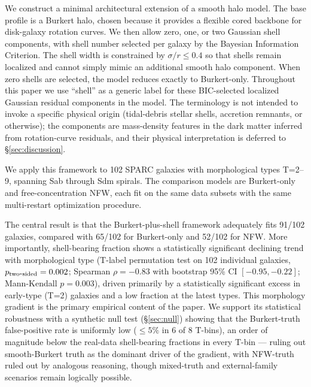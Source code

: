 We construct a minimal architectural extension of a smooth halo model. The base profile is a Burkert halo, chosen because it provides a flexible cored backbone for disk-galaxy rotation curves. We then allow zero, one, or two Gaussian shell components, with shell number selected per galaxy by the Bayesian Information Criterion. The shell width is constrained by $\sigma/r \leq 0.4$ so that shells remain localized and cannot simply mimic an additional smooth halo component. When zero shells are selected, the model reduces exactly to Burkert-only. Throughout this paper we use ``shell'' as a generic label for these BIC-selected localized Gaussian residual components in the model. The terminology is not intended to invoke a specific physical origin (tidal-debris stellar shells, accretion remnants, or otherwise); the components are mass-density features in the dark matter inferred from rotation-curve residuals, and their physical interpretation is deferred to \S\ref{sec:discussion}.

We apply this framework to 102 SPARC \citep{Lelli2016} galaxies with morphological types T=2--9, spanning Sab through Sdm spirals. The comparison models are Burkert-only and free-concentration NFW, each fit on the same data subsets with the same multi-restart optimization procedure.

The central result is that the Burkert-plus-shell framework adequately fits 91/102 galaxies, compared with 65/102 for Burkert-only and 52/102 for NFW. More importantly, shell-bearing fraction shows a statistically significant declining trend with morphological type (T-label permutation test on 102 individual galaxies, $p_{\rm two\mbox{-}sided} = 0.002$; Spearman $\rho = -0.83$ with bootstrap 95\% CI $[-0.95, -0.22]$; Mann-Kendall $p = 0.003$), driven primarily by a statistically significant excess in early-type (T=2) galaxies and a low fraction at the latest types. This morphology gradient is the primary empirical content of the paper. We support its statistical robustness with a synthetic null test (\S\ref{sec:null}) showing that the Burkert-truth false-positive rate is uniformly low ($\leq 5\%$ in 6 of 8 T-bins), an order of magnitude below the real-data shell-bearing fractions in every T-bin --- ruling out smooth-Burkert truth as the dominant driver of the gradient, with NFW-truth ruled out by analogous reasoning, though mixed-truth and external-family scenarios remain logically possible.

